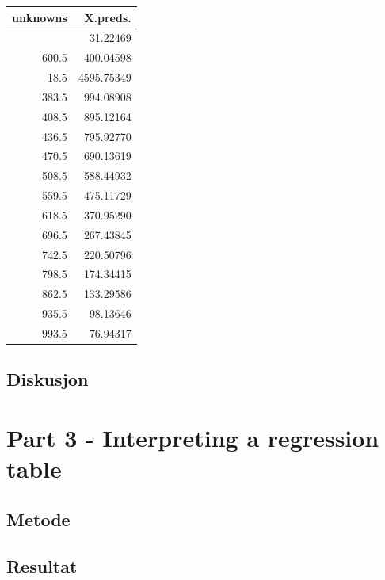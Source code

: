 \documentclass[
  letterpaper,
  DIV=11,
  numbers=noendperiod]{scrreprt}
\begin{document}
\begingroup
\fontsize{12.0pt}{14.4pt}\selectfont
\begin{longtable*}{rr}
\toprule
unknowns & X.preds. \\ 
\midrule{} & 31.22469 \\ 
600.5 & 400.04598 \\ 
18.5 & 4595.75349 \\ 
383.5 & 994.08908 \\ 
408.5 & 895.12164 \\ 
436.5 & 795.92770 \\ 
470.5 & 690.13619 \\ 
508.5 & 588.44932 \\ 
559.5 & 475.11729 \\ 
618.5 & 370.95290 \\ 
696.5 & 267.43845 \\ 
742.5 & 220.50796 \\ 
798.5 & 174.34415 \\ 
862.5 & 133.29586 \\ 
935.5 & 98.13646 \\ 
993.5 & 76.94317 \\ 
\bottomrule
\end{longtable*}
\endgroup

\subsection{Diskusjon}\label{diskusjon-2}

\section{Part 3 - Interpreting a regression
table}\label{part-3---interpreting-a-regression-table}

\subsection{Metode}\label{metode-3}

\subsection{Resultat}\label{resultat-3}
\end{document}
